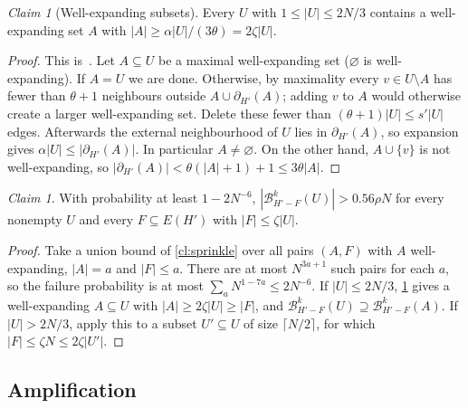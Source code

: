 \documentclass[11pt]{article}
\theoremstyle{definition}
\theoremstyle{remark}
\newtheorem{aclaim}[theorem]{Claim}
\numberwithin{equation}{section}
\numberwithin{figure}{section}
\numberwithin{table}{section}
\newcommand{\NN}{\partial}
\newcommand{\cB}{\mathcal{B}}
\begin{document}
\begin{aclaim}[Well-expanding subsets]\label{cl:wellexp}
Every $U$ with $1\le|U|\le2N/3$ contains a well-expanding set $A$ with
$|A|\ge\alpha|U|/(3\theta)=2\zeta|U|$.
\end{aclaim}

\begin{proof}
This is~\cite[Proposition~18]{BM}. Let $A\subseteq U$ be a maximal
well-expanding set ($\varnothing$ is well-expanding). If $A=U$ we are done.
Otherwise, by maximality every $v\in U\setminus A$ has fewer than $\theta+1$
neighbours outside $A\cup\NN_{H'}(A)$; adding $v$ to $A$ would otherwise create
a larger well-expanding set. Delete these fewer than $(\theta+1)|U|\le s'|U|$
edges. Afterwards the external neighbourhood of $U$ lies in $\NN_{H'}(A)$, so
expansion gives $\alpha|U|\le|\NN_{H'}(A)|$. In particular $A\ne\varnothing$.
On the other hand, $A\cup\{v\}$ is not well-expanding, so
$|\NN_{H'}(A)|<\theta(|A|+1)+1\le3\theta|A|$.
\end{proof}

\begin{aclaim}\label{cl:balls}
With probability at least $1-2N^{-6}$, $|\cB^k_{H'-F}(U)|>0.56\rho N$ for every
nonempty $U$ and every $F\subseteq E(H')$ with $|F|\le\zeta|U|$.
\end{aclaim}

\begin{proof}
Take a union bound of \cref{cl:sprinkle} over all pairs $(A,F)$ with $A$
well-expanding, $|A|=a$ and $|F|\le a$. There are at most $N^{3a+1}$ such pairs
for each $a$, so the failure probability is at most
$\sum_aN^{1-7a}\le2N^{-6}$. If $|U|\le2N/3$, \cref{cl:wellexp} gives a
well-expanding $A\subseteq U$ with $|A|\ge2\zeta|U|\ge|F|$, and
$\cB^k_{H'-F}(U)\supseteq\cB^k_{H'-F}(A)$. If $|U|>2N/3$, apply this to a subset
$U'\subseteq U$ of size $\lceil N/2\rceil$, for which
$|F|\le\zeta N\le2\zeta|U'|$.
\end{proof}

\subsection*{Amplification}
\end{document}
